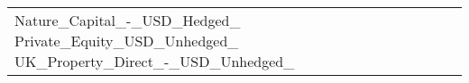 \begin{tabular}{lrrrrrrrr}
Nature_Capital_-_USD_Hedged_%
Private_Equity_USD_Unhedged_%
UK_Property_Direct_-_USD_Unhedged_%
\end{tabular}
